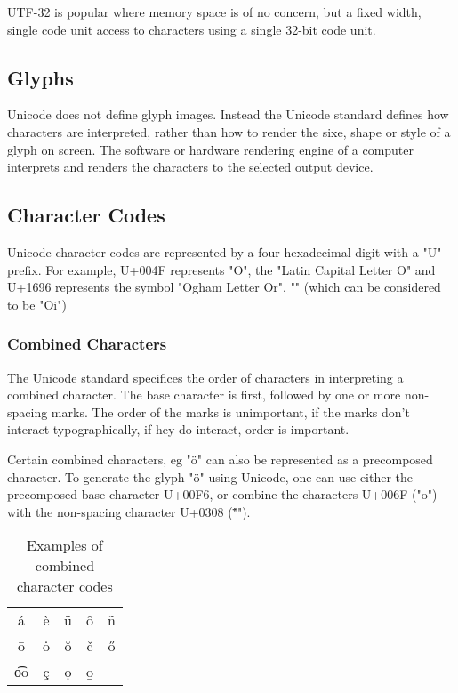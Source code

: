 UTF-32 is popular where memory space is of no concern, but a fixed
width, single code unit access to characters using a single 32-bit code
unit.

\subsection{Glyphs}

Unicode does not define glyph images. Instead the Unicode standard
defines how characters are interpreted, rather than how to render the
sixe, shape or style of a glyph on screen. The software or hardware 
rendering engine of a computer interprets and renders the characters to 
the selected output device.

\subsection{Character Codes}

Unicode character codes are represented by a four hexadecimal digit with
a "U" prefix. For example, U+004F represents "O", the "Latin Capital 
Letter O" and U+1696 represents the symbol "Ogham Letter Or", "\OghamOr"
(which can be considered to be "Oi")

\subsubsection{Combined Characters}

The Unicode standard specifices the order of characters in interpreting 
a combined character. The base character is first, followed by one or
more non-spacing marks. The order of the marks is unimportant, if the 
marks don't interact typographically, if hey do interact, order is
important.


Certain combined characters, eg "\"{o}" can also be represented as a
precomposed character. To generate the glyph "\"{o}" using Unicode, one
can use either the precomposed base character U+00F6, or combine the
characters U+006F ("o") with the non-spacing character U+0308 ("\"{ }").

\begin{table}

\begin{center}

\begin{tabular}{ccccc}
\'{a}	&	\`{e}	&	\"{u}	&	\^{o}	&	\~{n}	\\
\={o}	&	\.{o}	&	\u{o}	&	\v{c}	&	\H{o}	\\
\t{oo}&	\c{c}	&	\d{o}	&	\b{o}	&			\\
\end{tabular}

\end{center}

\caption{Examples of combined character codes}

\end{table}

